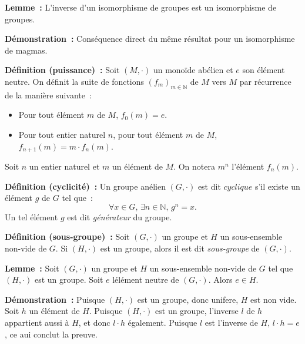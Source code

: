 \medskip

\noindent\textbf{Lemme :} L'inverse d'un isomorphisme de groupes est un isomorphisme de groupes.

\medskip

\noindent\textbf{Démonstration :} Conséquence direct du même résultat pour un isomorphisme de magmas.

\medskip

\noindent\textbf{Définition (puissance) :} Soit $(M,\cdot)$ un monoïde abélien et $e$ son élément neutre. 
    On définit la suite de fonctions $\left( f_m \right)_{m \in \mathbb{N}}$ de $M$ vers $M$ par récurrence de la manière suivante : 
    \begin{itemize}[nosep]
        \item Pour tout élément $m$ de $M$, $f_0(m) = e$.
        \item Pour tout entier naturel $n$, pour tout élément $m$ de $M$, $f_{n+1}(m) = m \cdot f_n(m)$.
    \end{itemize}
    Soit $n$ un entier naturel et $m$ un élément de $M$. 
    On notera $m^n$ l'élément $f_n(m)$.

\medskip

\noindent\textbf{Définition (cyclicité) :} Un groupe anélien $(G, \cdot)$ est dit $\textit{cyclique}$ s'il existe un élément $g$ de $G$ tel que : 
    \begin{equation*}
        \forall x \in G, \, \exists n \in \mathbb{N}, \, g^n = x.
    \end{equation*}
    Un tel élément $g$ est dit \textit{générateur} du groupe.

\medskip

\noindent\textbf{Définition (sous-groupe) :} Soit $(G, \cdot)$ un groupe et $H$ un sous-ensemble non-vide de $G$.
    Si $(H, \cdot)$ est un groupe, alors il est dit \textit{sous-groupe} de $(G, \cdot)$.

\medskip

\noindent\textbf{Lemme :} Soit $(G, \cdot)$ un groupe et $H$ un sous-ensemble non-vide de $G$ tel que $(H, \cdot)$ est un groupe.
    Soit $e$ lélément neutre de $(G, \cdot)$. 
    Alors $e \in H$.

\medskip

\noindent\textbf{Démonstration :} Puisque $(H, \cdot)$ est un groupe, donc unifere, $H$ est non vide. 
    Soit $h$ un élément de $H$. 
    Puisque $(H, \cdot)$ est un groupe, l'inverse $l$ de $h$ appartient aussi à $H$, et donc $l \cdot h$ également. 
    Puisque $l$ est l'inverse de $H$, $l \cdot h = e$, ce aui conclut la preuve.

